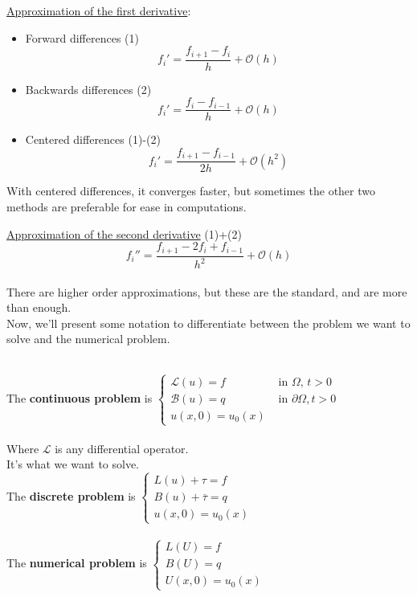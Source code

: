 \underline{Approximation of the first derivative}: \\
\begin{itemize}
    \item Forward differences (1) $$f_i' = \frac{f_{i+1} - f_i}{h} + \mathcal{O}(h)$$
    \item Backwards differences (2) $$f_i' = \frac{f_i-f_{i-1}}{h} + \mathcal{O}(h)$$
    \item Centered differences (1)-(2) $$f_i' = \frac{f_{i+1} - f_{i-1}}{2h} + \mathcal{O}(h^2)$$
\end{itemize}

\begin{remark}
  With centered differences, it converges faster, but sometimes the other two methods are preferable for ease in computations.
\end{remark}

\underline{Approximation of the second derivative} (1)+(2) $$f_i'' = \frac{f_{i+1} - 2f_i + f_{i-1}}{h^2} + \mathcal{O}(h)$$\\

There are higher order approximations, but these are the standard, and are more than enough. \\

Now, we'll present some notation to differentiate between the problem we want to solve and the numerical problem.

\begin{definition}\-\\
  The \textbf{continuous problem} is 
  $
    \begin{cases}
      \mathcal{L}(u) = f &\text{ in } \Omega, \, t > 0 \\
      \mathcal{B}(u) = q &\text{ in } \partial \Omega, t > 0 \\
      u(x,0) = u_0(x)
    \end{cases}
  $\\
  
  \-\\Where $\mathcal{L}$ is any differential operator. \\
  
  It's what we want to solve. \\
  
  The \textbf{discrete problem} \hspace{0.08cm}is\hspace{0.3cm}
  $
    \begin{cases}
      L(u) + \tau = f \\
      B(u) + \overline{\tau} = q \\
      u(x,0) = u_0(x)
    \end{cases}
  $\\
  
  \-\\The \textbf{numerical problem} is
  $
    \begin{cases}
      L(U) = f \\
      B(U) = q \\
      U(x,0) = u_0(x)
    \end{cases}
  $
\end{definition}

